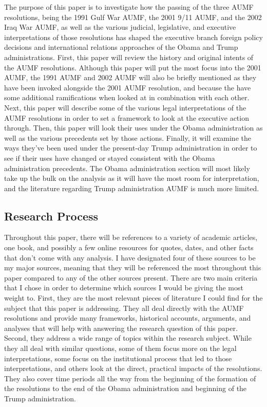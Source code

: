 \documentclass[12pt]{article}
\begin{document}
The purpose of this paper is to investigate how the passing of the three AUMF resolutions, being the 1991 Gulf War AUMF, the 2001 9/11 AUMF, and the 2002 Iraq War AUMF, as well as the various judicial, legislative, and executive interpretations of those resolutions has shaped the executive branch foreign policy decisions and international relations approaches of the Obama and Trump administrations.
First, this paper will review the history and original intents of the AUMF resolutions.
Although this paper will put the most focus into the 2001 AUMF, the 1991 AUMF and 2002 AUMF will also be briefly mentioned as they have been invoked alongside the 2001 AUMF resolution, and because the have some additional ramifications when looked at in combination with each other.
Next, this paper will describe some of the various legal interpretations of the AUMF resolutions in order to set a framework to look at the executive action through.
Then, this paper will look their uses under the Obama administration as well as the various precedents set by those actions.
Finally, it will examine the ways they've been used under the present-day Trump administration in order to see if their uses have changed or stayed consistent with the Obama administration precedents.
The Obama administration section will most likely take up the bulk on the analysis as it will have the most room for interpretation, and the literature regarding Trump administration AUMF is much more limited.

\subsection*{Research Process}
Throughout this paper, there will be references to a variety of academic articles, one book, and possibly a few online resources for quotes, dates, and other facts that don't come with any analysis.
I have designated four of these sources to be my major sources, meaning that they will be referenced the most throughout this paper compared to any of the other sources present.
There are two main criteria that I chose in order to determine which sources I would be giving the most weight to.
First, they are the most relevant pieces of literature I could find for the subject that this paper is addressing.
They all deal directly with the AUMF resolutions and provide many frameworks, historical accounts, arguments, and analyses that will help with answering the research question of this paper.
Second, they address a wide range of topics within the research subject.
While they all deal with similar questions, some of them focus more on the legal interpretations, some focus on the institutional process that led to those interpretations, and others look at the direct, practical impacts of the resolutions.
They also cover time periods all the way from the beginning of the formation of the resolutions to the end of the Obama administration and beginning of the Trump administration.
\end{document}
